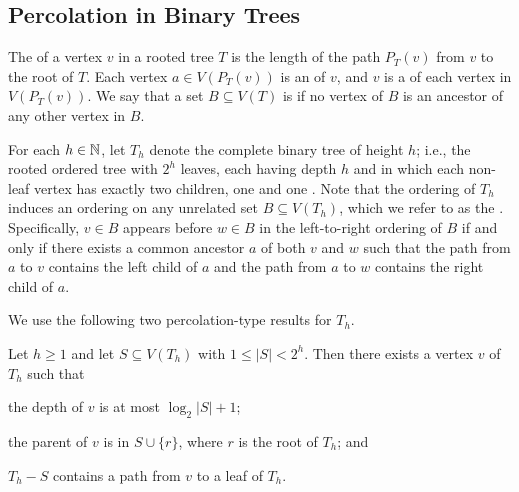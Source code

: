 \documentclass{patmorin}
\renewcommand{\le}{\leqslant}
\renewcommand{\ge}{\geqslant}
\begin{document}
\subsection{Percolation in Binary Trees}


The  of a vertex $v$ in a rooted tree $T$ is the length of the path $P_T(v)$ from $v$ to the root of $T$.  Each vertex $a\in V(P_T(v))$ is an  of $v$, and $v$ is a  of each vertex in $V(P_T(v))$.  We say that a set $B\subseteq V(T)$ is  if no vertex of $B$ is an ancestor of any other vertex in $B$.

For each $h\in\mathbb{N}$, let $T_h$ denote the complete binary tree of height $h$; i.e., the rooted ordered tree with $2^h$ leaves, each having depth $h$ and in which each non-leaf vertex has exactly two children, one  and one .  Note that the ordering of $T_h$ induces an ordering on any unrelated set $B\subseteq V(T_h)$, which we refer to as the .  Specifically, $v\in B$ appears before $w\in B$ in the left-to-right ordering of $B$ if and only if there exists a common ancestor $a$ of both $v$ and $w$ such that the path from $a$ to $v$ contains the left child of $a$ and the path from $a$ to $w$ contains the right child of $a$.

We use the following two percolation-type results for $T_h$.

\begin{lem}\label{one_path}
  Let $h\ge 1$
  and let $S\subseteq V(T_h)$ with $1\le |S|< 2^h$. Then there exists a vertex $v$ of $T_h$ such that
  \begin{compactenum}[(i)]
    \item the depth of $v$ is at most $\log_2|S|+1$;
    \item the parent of $v$ is in $S\cup\{r\}$, where $r$ is the root of $T_h$; and
    \item $T_h-S$ contains a path from $v$ to a leaf of $T_h$.
  \end{compactenum}
\end{lem}
\end{document}
